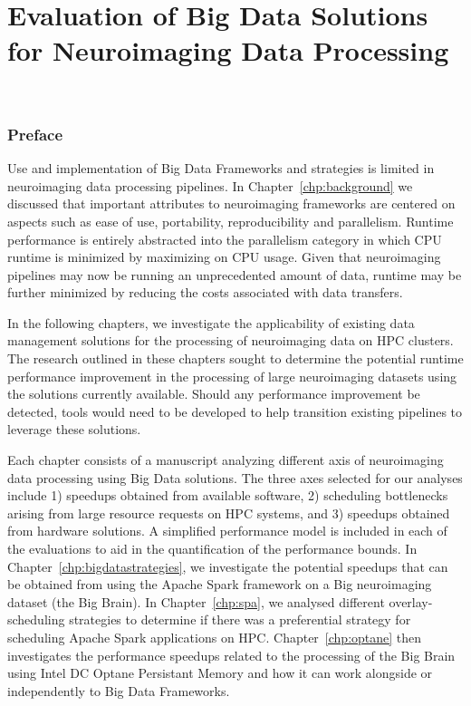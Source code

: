 \part{Evaluation of Big Data Solutions for Neuroimaging Data Processing}~\label{part:evaluation}
\section*{Preface}
Use and implementation of Big Data Frameworks and strategies is limited in
neuroimaging data processing pipelines. In Chapter~\ref{chp:background} we discussed
that important attributes to neuroimaging frameworks are centered on aspects
such as ease of use, portability, reproducibility and parallelism. Runtime performance
is entirely abstracted into the parallelism category in which CPU runtime is minimized
by maximizing on CPU usage. Given that neuroimaging pipelines may now be running an unprecedented
amount of data, runtime may be further minimized by reducing the costs associated with data
transfers.

In the following chapters, we investigate the applicability of existing data management
solutions for the processing of neuroimaging data on HPC clusters. The research outlined
in these chapters sought to determine the potential runtime performance
improvement in the processing of large neuroimaging datasets using the solutions currently
available. Should any performance improvement be detected, tools would need to be developed
to help transition existing pipelines to leverage these solutions.

Each chapter consists of a manuscript analyzing different axis of neuroimaging data processing
using Big Data solutions. The three axes selected for our analyses include 1) speedups obtained
from available software, 2) scheduling bottlenecks arising from large resource requests on HPC systems, and
3) speedups obtained from hardware solutions. A simplified performance model is included in 
each of the evaluations to aid in the quantification of the performance bounds.
In Chapter~\ref{chp:bigdatastrategies},
we investigate the potential speedups that can be obtained from using the Apache Spark
framework on a Big neuroimaging dataset (the Big Brain). In Chapter~\ref{chp:spa}, 
we analysed different overlay-scheduling strategies to determine if there was a 
preferential strategy for scheduling Apache Spark applications on HPC. Chapter~\ref{chp:optane}
then investigates the performance speedups related to the processing of the Big Brain using
Intel DC Optane Persistant Memory and how it can work alongside or independently to Big Data
Frameworks.  